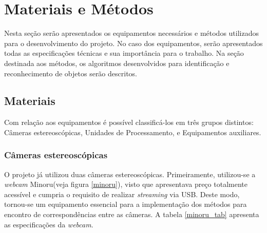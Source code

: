 \chapter{Materiais e Métodos}
\label{Materiais}


Nesta seção serão apresentados os equipamentos necessários e métodos utilizados para o desenvolvimento do projeto. No caso dos equipamentos, serão apresentados todas as especificações técnicas e sua importância para o trabalho. Na seção destinada aos métodos, os algoritmos desenvolvidos para identificação e reconhecimento de objetos serão descritos.

\section{Materiais}
Com relação aos equipamentos é possível classificá-los em três grupos distintos:
Câmeras estereoscópicas, Unidades de Processamento, e Equipamentos auxiliares.

\subsection{Câmeras estereoscópicas}

O projeto já utilizou duas câmeras estereoscópicas. Primeiramente, utilizou-se a \textit{webcam} Minoru(veja figura \ref{minoru}), visto que apresentava preço totalmente acessível e cumpria o requisito de realizar \textit{streaming} via USB. Deste modo, tornou-se um equipamento essencial para a implementação dos métodos para encontro de correspondências entre as câmeras. A tabela \ref{minoru_tab}	 apresenta as especificações da \textit{webcam}.

